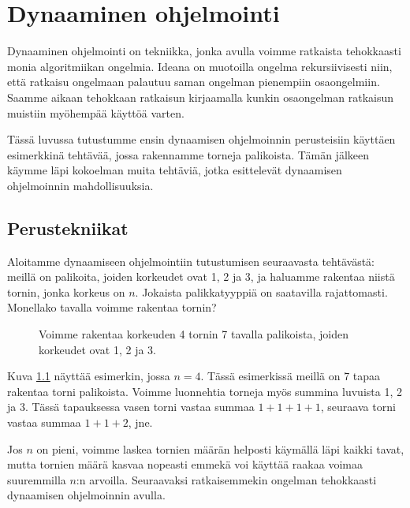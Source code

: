 \chapter{Dynaaminen ohjelmointi}

Dynaaminen ohjelmointi on tekniikka,
jonka avulla voimme ratkaista tehokkaasti monia
algoritmiikan ongelmia.
Ideana on muotoilla ongelma rekursiivisesti niin,
että ratkaisu ongelmaan palautuu saman ongelman
pienempiin osaongelmiin.
Saamme aikaan tehokkaan ratkaisun kirjaamalla
kunkin osaongelman ratkaisun muistiin myöhempää käyttöä varten.

Tässä luvussa tutustumme ensin dynaamisen ohjelmoinnin perusteisiin
käyttäen esimerkkinä tehtävää, jossa rakennamme torneja palikoista.
Tämän jälkeen käymme läpi kokoelman muita tehtäviä, jotka esittelevät
dynaamisen ohjelmoinnin mahdollisuuksia.

\section{Perustekniikat}

Aloitamme dynaamiseen ohjelmointiin tutustumisen
seuraavasta tehtävästä:
meillä on palikoita, joiden korkeudet ovat 1, 2 ja 3,
ja haluamme rakentaa niistä tornin, jonka korkeus on $n$.
Jokaista palikkatyyppiä on saatavilla rajattomasti.
Monellako tavalla voimme rakentaa tornin?

\begin{figure}
\center
{}
\caption{Voimme rakentaa korkeuden 4 tornin 7 tavalla palikoista,
joiden korkeudet ovat 1, 2 ja 3.}
\label{fig:dyntor}
\end{figure}

Kuva \ref{fig:dyntor} näyttää esimerkin, jossa $n=4$.
Tässä esimerkissä meillä on 7 tapaa rakentaa torni palikoista.
Voimme luonnehtia torneja myös summina luvuista 1, 2 ja 3.
Tässä tapauksessa vasen torni vastaa summaa $1+1+1+1$,
seuraava torni vastaa summaa $1+1+2$, jne.

Jos $n$ on pieni, voimme laskea tornien määrän helposti
käymällä läpi kaikki tavat, mutta tornien määrä kasvaa
nopeasti emmekä voi käyttää raakaa voimaa suuremmilla
$n$:n arvoilla.
Seuraavaksi ratkaisemmekin ongelman tehokkaasti
dynaamisen ohjelmoinnin avulla.

